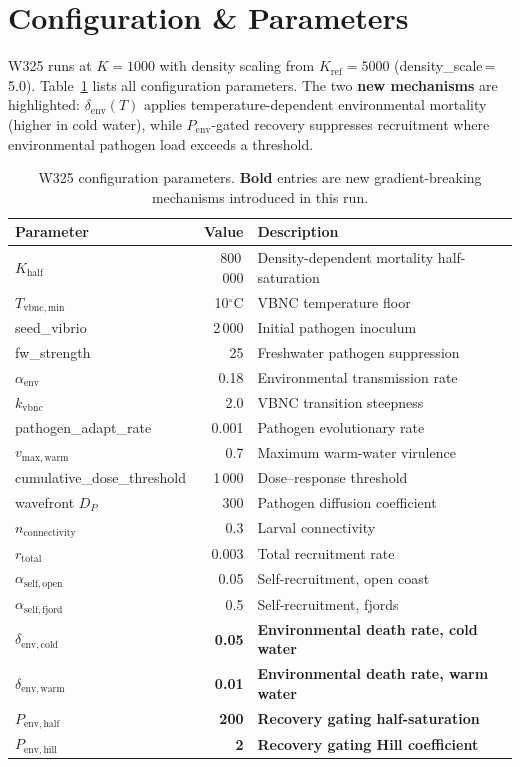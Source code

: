 \documentclass[11pt,letterpaper]{article}
\begin{document}
\section{Configuration \& Parameters}

W325 runs at $K=1000$ with density scaling from $K_{\mathrm{ref}}=5000$ (density\_scale\,=\,5.0).
Table~\ref{tab:params} lists all configuration parameters.
The two \textbf{new mechanisms} are highlighted: $\delta_{\mathrm{env}}(T)$ applies temperature-dependent environmental mortality (higher in cold water), while $P_{\mathrm{env}}$-gated recovery suppresses recruitment where environmental pathogen load exceeds a threshold.

\begin{table}[H]
\centering
\small
\caption{W325 configuration parameters. \textbf{Bold} entries are new gradient-breaking mechanisms introduced in this run.}
\label{tab:params}
\begin{tabular}{lrl}
\toprule
\textbf{Parameter} & \textbf{Value} & \textbf{Description} \\
\midrule
$K_{\mathrm{half}}$ & 800\,000 & Density-dependent mortality half-saturation \\
$T_{\mathrm{vbnc,min}}$ & 10$^\circ$C & VBNC temperature floor \\
seed\_vibrio & 2\,000 & Initial pathogen inoculum \\
fw\_strength & 25 & Freshwater pathogen suppression \\
$\alpha_{\mathrm{env}}$ & 0.18 & Environmental transmission rate \\
$k_{\mathrm{vbnc}}$ & 2.0 & VBNC transition steepness \\
pathogen\_adapt\_rate & 0.001 & Pathogen evolutionary rate \\
$v_{\mathrm{max,warm}}$ & 0.7 & Maximum warm-water virulence \\
cumulative\_dose\_threshold & 1\,000 & Dose--response threshold \\
wavefront $D_P$ & 300 & Pathogen diffusion coefficient \\
$n_{\mathrm{connectivity}}$ & 0.3 & Larval connectivity \\
$r_{\mathrm{total}}$ & 0.003 & Total recruitment rate \\
$\alpha_{\mathrm{self,open}}$ & 0.05 & Self-recruitment, open coast \\
$\alpha_{\mathrm{self,fjord}}$ & 0.5 & Self-recruitment, fjords \\
\midrule
\textbf{$\delta_{\mathrm{env,cold}}$} & \textbf{0.05} & \textbf{Environmental death rate, cold water} \\
\textbf{$\delta_{\mathrm{env,warm}}$} & \textbf{0.01} & \textbf{Environmental death rate, warm water} \\
\textbf{$P_{\mathrm{env,half}}$} & \textbf{200} & \textbf{Recovery gating half-saturation} \\
\textbf{$P_{\mathrm{env,hill}}$} & \textbf{2} & \textbf{Recovery gating Hill coefficient} \\
\bottomrule
\end{tabular}
\end{table}
\end{document}
